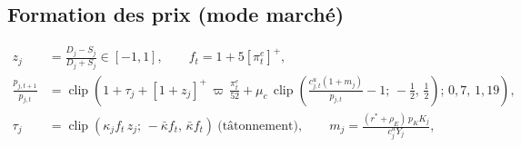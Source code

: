 \documentclass[11pt,a4paper]{article}
\newcommand{\pos}[1]{{\left[#1\right]^{+}}}
\newcommand{\clip}[3]{\operatorname{clip}\!\left(#1;\,#2,\,#3\right)}
\begin{document}
\subsection{Formation des prix (mode marché)}
\begin{equation}
\begin{split}
z_j &= \frac{D_j - S_j}{D_j + S_j} \in [-1,1], \qquad f_t = 1 + 5\pos{\pi^e_t},\\
\frac{p_{j,t+1}}{p_{j,t}} &= \clip{1 + \tau_j + \pos{1+z_j}\,\varpi\,\frac{\pi^e_t}{52} + \mu_c\,\clip{\frac{c^{u}_{j,t}(1+m_j)}{p_{j,t}} - 1}{-\tfrac12}{\tfrac12}}{0{,}7}{1{,}19},\\
\tau_j &= \clip{\kappa_j f_t\, z_j}{-\bar\kappa f_t}{\bar\kappa f_t} \ \text{(tâtonnement)},\qquad m_j = \frac{(r^\ast+\rho_E)\,p_KK_j}{c^u_jY_j},
\end{split}
\label{eq:price}
\end{equation}
\end{document}

